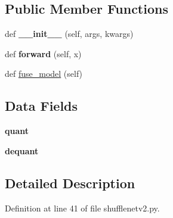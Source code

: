 \subsection*{Public Member Functions}
\begin{DoxyCompactItemize}
\item 
\mbox{\label{classtorchvision_1_1models_1_1quantization_1_1shufflenetv2_1_1QuantizableShuffleNetV2_aaad67b2c2fded2e5acb3d48a3fbdd9c2}} 
def {\bfseries \+\_\+\+\_\+init\+\_\+\+\_\+} (self, args, kwargs)
\item 
\mbox{\label{classtorchvision_1_1models_1_1quantization_1_1shufflenetv2_1_1QuantizableShuffleNetV2_a6f6d8eee27e2369ee438b7dc0e37d830}} 
def {\bfseries forward} (self, x)
\item 
def \hyperlink{classtorchvision_1_1models_1_1quantization_1_1shufflenetv2_1_1QuantizableShuffleNetV2_a63bec221f4e8efd09d8910d1387fa58b}{fuse\+\_\+model} (self)
\end{DoxyCompactItemize}
\subsection*{Data Fields}
\begin{DoxyCompactItemize}
\item 
\mbox{\label{classtorchvision_1_1models_1_1quantization_1_1shufflenetv2_1_1QuantizableShuffleNetV2_a75e4d45c4af1461ae2d576b8e7f9467f}} 
{\bfseries quant}
\item 
\mbox{\label{classtorchvision_1_1models_1_1quantization_1_1shufflenetv2_1_1QuantizableShuffleNetV2_a3da3afaa06ad6e9d983b3674d855eb4d}} 
{\bfseries dequant}
\end{DoxyCompactItemize}


\subsection{Detailed Description}


Definition at line 41 of file shufflenetv2.\+py.



